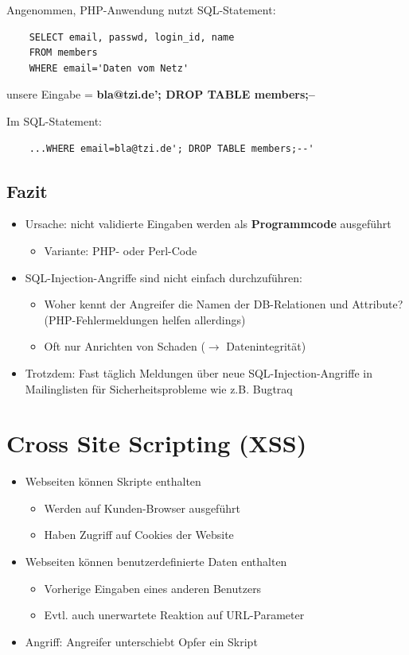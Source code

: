 \documentclass[openany]{book}
\begin{document}
Angenommen, PHP-Anwendung nutzt SQL-Statement:

\begin{lstlisting}
    SELECT email, passwd, login_id, name 
    FROM members 
    WHERE email='Daten vom Netz'
\end{lstlisting}

unsere Eingabe = \textbf{bla@tzi.de'; DROP TABLE members;--}

Im SQL-Statement:

\begin{lstlisting}
    ...WHERE email=bla@tzi.de'; DROP TABLE members;--'
\end{lstlisting}

\subsection{Fazit}

\begin{itemize}
    \item Ursache: nicht validierte Eingaben werden als \textbf{Programmcode} ausgeführt
    \begin{itemize}
        \item Variante: PHP- oder Perl-Code
    \end{itemize}
    \item SQL-Injection-Angriffe sind nicht einfach durchzuführen:
    \begin{itemize}
        \item Woher kennt der Angreifer die Namen der DB-Relationen und Attribute? (PHP-Fehlermeldungen helfen allerdings)
        \item Oft nur Anrichten von Schaden ($\rightarrow$ Datenintegrität)
    \end{itemize}
    \item Trotzdem: Fast täglich Meldungen über neue SQL-Injection-Angriffe in Mailinglisten für Sicherheitsprobleme wie z.B. Bugtraq
\end{itemize}

\section{Cross Site Scripting (XSS)}

\begin{itemize}
    \item Webseiten können Skripte enthalten
    \begin{itemize}
        \item Werden auf Kunden-Browser ausgeführt
        \item Haben Zugriff auf Cookies der Website
    \end{itemize}
    \item Webseiten können benutzerdefinierte Daten enthalten
    \begin{itemize}
        \item Vorherige Eingaben eines anderen Benutzers
        \item Evtl. auch unerwartete Reaktion auf URL-Parameter
    \end{itemize}
    \item Angriff: Angreifer unterschiebt Opfer ein Skript
\end{itemize}
\end{document}
